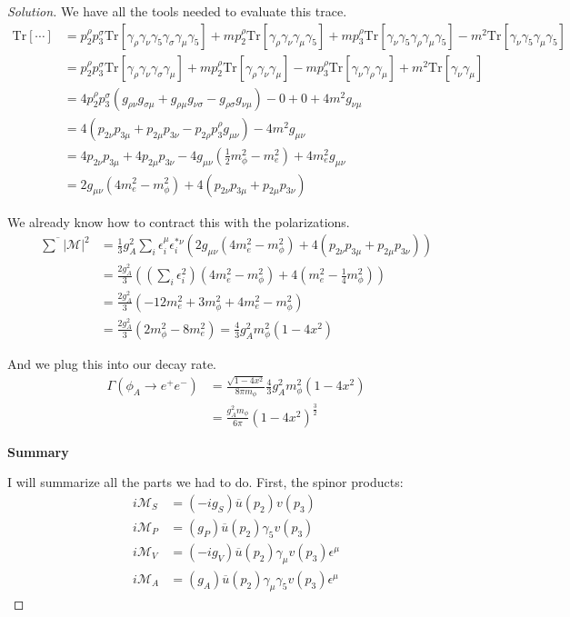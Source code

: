 \documentclass[12pt]{article}
\newenvironment{solution}{\begin{proof}[Solution]}{\end{proof}}
\begin{document}
\begin{solution}
We have all the tools needed to evaluate this trace.
\begin{align*}
    \text{Tr}[\cdots]&=p_2^\rho p_3^\sigma \text{Tr}[\gamma_\rho \gamma_\nu \gamma_5 \gamma_\sigma \gamma_\mu \gamma_5] + mp_2^\rho \text{Tr}[\gamma_\rho \gamma_\nu \gamma_\mu \gamma_5] + mp_3^\rho \text{Tr}[\gamma_\nu\gamma_5 \gamma_\rho \gamma_\mu\gamma_5] -m^2 \text{Tr}[\gamma_\nu \gamma_5\gamma_\mu\gamma_5] \\
    &=p_2^\rho p_3^\sigma \text{Tr}[\gamma_\rho \gamma_\nu\gamma_\sigma \gamma_\mu] + mp_2^\rho \text{Tr}[\gamma_\rho \gamma_\nu  \gamma_\mu ] - mp_3^\rho \text{Tr}[\gamma_\nu \gamma_\rho \gamma_\mu] +m^2 \text{Tr}[\gamma_\nu \gamma_\mu] \\
    &= 4 p_2^\rho p_3^\sigma(g_{\rho\nu} g_{\sigma \mu} + g_{\rho\mu} g_{\nu\sigma} - g_{\rho\sigma} g_{\nu\mu})-0+0+4m^2 g_{\nu\mu} \\
    &= 4(p_{2\nu} p_{3\mu} + p_{2\mu} p_{3\nu}-p_{2\rho}p_3^\rho g_{\mu\nu})-4m^2g_{\mu\nu} \\ 
    &= 4p_{2\nu} p_{3\mu} + 4p_{2\mu} p_{3\nu}-4g_{\mu\nu}(\frac{1}{2}m_\phi^2-m_e^2)+4m_e^2g_{\mu\nu} \\
    &= 2g_{\mu\nu}(4m_e^2-m_\phi^2)+4(p_{2\nu} p_{3\mu}+p_{2\mu}p_{3\nu})
\end{align*}

We already know how to contract this with the polarizations.
\begin{align*}
    \overline{\sum}|\mathcal{M}|^2&=\frac{1}{3}g_A^2 \sum_i\epsilon_i^\mu \epsilon_i^{*\nu}\left(2g_{\mu\nu}(4m_e^2-m_\phi^2)+4(p_{2\nu} p_{3\mu}+p_{2\mu}p_{3\nu})\right) \\
    &= \frac{2g_A^2}{3}\left((\sum_i\epsilon_i^2)(4m_e^2-m_\phi^2)+4(m_e^2-\frac{1}{4}m_\phi^2)\right) \\
    &= \frac{2g_A^2}{3}\left(-12m_e^2+3m_\phi^2+4m_e^2-m_\phi^2\right) \\
    &= \frac{2g_A^2}{3}(2m_\phi^2-8m_e^2)=\frac{4}{3}g_A^2m_\phi^2(1-4x^2)
\end{align*}

And we plug this into our decay rate.
\begin{align*}
    \Gamma(\phi_A\rightarrow e^+e^-)&=\frac{\sqrt{1-4x^2}}{8\pi m_\phi}\frac{4}{3}g_A^2m_\phi^2(1-4x^2) \\
    &= \frac{g_A^2m_\phi}{6\pi}(1-4x^2)^\frac{3}{2}
\end{align*}

\textbf{Summary}

I will summarize all the parts we had to do. First, the spinor products:
\begin{align*}
    i\mathcal{M}_S&=(-ig_S)\overline{u}(p_2)v(p_3) \\
    i\mathcal{M}_P&=(g_P)\overline{u}(p_2)\gamma_5v(p_3) \\
    i\mathcal{M}_V&=(-ig_V)\overline{u}(p_2)\gamma_\mu v(p_3)\epsilon^\mu \\
    i\mathcal{M}_A&=(g_A)\overline{u}(p_2)\gamma_\mu\gamma_5v(p_3)\epsilon^\mu
\end{align*}


\end{solution}
\end{document}

